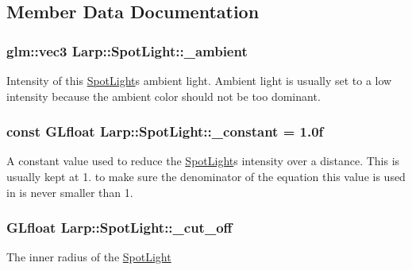 \subsection{Member Data Documentation}
\subsubsection[{\texorpdfstring{\+\_\+ambient}{_ambient}}]{\setlength{\rightskip}{0pt plus 5cm}glm\+::vec3 Larp\+::\+Spot\+Light\+::\+\_\+ambient}\hypertarget{structLarp_1_1SpotLight_a822a42d8e8d8de3e402aa8c789673f05}{}\label{structLarp_1_1SpotLight_a822a42d8e8d8de3e402aa8c789673f05}
Intensity of this \hyperlink{structLarp_1_1SpotLight}{Spot\+Light}\textquotesingle{}s ambient light. Ambient light is usually set to a low intensity because the ambient color should not be too dominant. 
\subsubsection[{\texorpdfstring{\+\_\+constant}{_constant}}]{\setlength{\rightskip}{0pt plus 5cm}const G\+Lfloat Larp\+::\+Spot\+Light\+::\+\_\+constant = 1.\+0f\hspace{0.3cm}{\ttfamily [static]}}\hypertarget{structLarp_1_1SpotLight_a8b82cccf921fa4b4257f788bbe849320}{}\label{structLarp_1_1SpotLight_a8b82cccf921fa4b4257f788bbe849320}
A constant value used to reduce the \hyperlink{structLarp_1_1SpotLight}{Spot\+Light}\textquotesingle{}s intensity over a distance. This is usually kept at 1. to make sure the denominator of the equation this value is used in is never smaller than 1. 
\subsubsection[{\texorpdfstring{\+\_\+cut\+\_\+off}{_cut_off}}]{\setlength{\rightskip}{0pt plus 5cm}G\+Lfloat Larp\+::\+Spot\+Light\+::\+\_\+cut\+\_\+off}\hypertarget{structLarp_1_1SpotLight_a3a834c8ac4551631afe4bc2d0247931c}{}\label{structLarp_1_1SpotLight_a3a834c8ac4551631afe4bc2d0247931c}
The inner radius of the \hyperlink{structLarp_1_1SpotLight}{Spot\+Light} 
